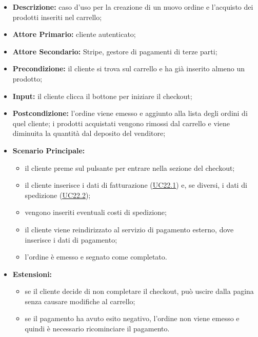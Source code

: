                 \begin{itemize}
                \item \textbf{Descrizione:} caso d'uso per la creazione di un nuovo ordine e l'acquisto dei prodotti inseriti nel carrello;
                \item \textbf{Attore Primario:} cliente autenticato;
                \item \textbf{Attore Secondario:} Stripe, gestore di pagamenti di terze parti;
                \item \textbf{Precondizione:} il cliente si trova sul carrello e ha già inserito almeno un prodotto;
                \item \textbf{Input:} il cliente clicca il bottone per iniziare il checkout;
                \item \textbf{Postcondizione:} l'ordine viene emesso e aggiunto alla lista degli ordini di quel cliente; i prodotti acquistati vengono rimossi dal carrello e viene diminuita la quantità dal deposito del venditore;
                \item \textbf{Scenario Principale:} 
                    \begin{itemize}
                        \item il cliente preme sul pulsante per entrare nella sezione del checkout;
                        \item il cliente inserisce i dati di fatturazione (\hyperref[sec:UC22.1]{\underline{UC22.1}}) e, se diversi, i dati di spedizione (\hyperref[sec:UC22.2]{\underline{UC22.2}});
                        \item vengono inseriti eventuali costi di spedizione;
                        \item il cliente viene reindirizzato al servizio di pagamento esterno, dove inserisce i dati di pagamento;
                        \item l'ordine è emesso e segnato come completato.
                    \end{itemize}
                \item \textbf{Estensioni:}
                    \begin{itemize}
                        \item se il cliente decide di non completare il checkout, può uscire dalla pagina senza causare modifiche al carrello;
                        \item se il pagamento ha avuto esito negativo, l'ordine non viene emesso e quindi è necessario ricominciare il pagamento.
                    \end{itemize}
            \end{itemize}
